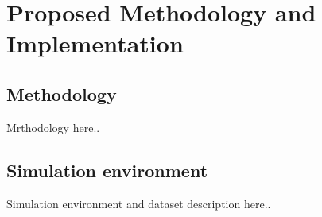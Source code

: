 \chapter{Proposed Methodology and Implementation}
\label{Chapter 3}

\section{Methodology}
Mrthodology here..
\section{Simulation environment}

Simulation environment and dataset description here..
